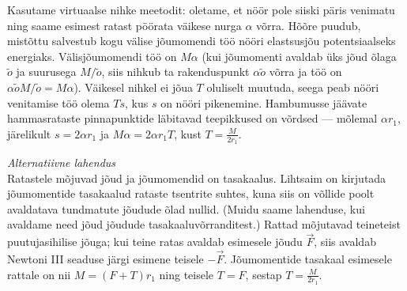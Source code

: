 {\ifSolution
Kasutame virtuaalse nihke meetodit: oletame, et nöör pole siiski päris venimatu ning
saame esimest ratast pöörata väikese nurga $\alpha$ võrra. Hõõre puudub,
mistõttu salvestub kogu välise jõumomendi töö nööri elastsusjõu potentsiaalseks
energiaks. Välisjõumomendi töö on $M \alpha$ (kui jõumomenti avaldab üks jõud
õlaga $\tilde o$ ja suurusega $M / \tilde o$, siis nihkub ta rakenduspunkt $\alpha
\tilde o$ võrra ja töö on $\alpha \tilde o M / \tilde o = M \alpha$). Väikesel
nihkel ei jõua $T$ oluliselt muutuda, seega peab nööri venitamise töö olema $T
s$, kus $s$ on nööri pikenemine. Hambumusse jäävate hammasrataste pinnapunktide
läbitavad teepikkused on võrdsed --- mõlemal $\alpha r_1$, järelikult $s = 2
\alpha r_1$ ja $M \alpha = 2 \alpha r_1 T$, kust $T = \frac{M}{2 r_1}$.

\vspace{0.5\baselineskip}
\textit{Alternatiivne lahendus}\\
Ratastele mõjuvad jõud ja jõumomendid on tasakaalus. Lihtsaim on kirjutada
jõumomentide tasakaalud rataste tsentrite suhtes, kuna siis on võllide poolt
avaldatava tundmatute jõudude õlad nullid. (Muidu saame lahenduse, kui avaldame
need jõud jõudude tasakaaluvõrranditest.) Rattad mõjutavad teineteist
puutujasihilise jõuga; kui teine ratas avaldab esimesele jõudu $\vec F$, siis
avaldab Newtoni III seaduse järgi esimene teisele $-\vec F$. Jõumomentide
tasakaal esimesele rattale on nii $M = (F+T) r_1$ ning teisele $T=F$, sestap
$T = \frac{M}{2 r_1}$.
\fi
}